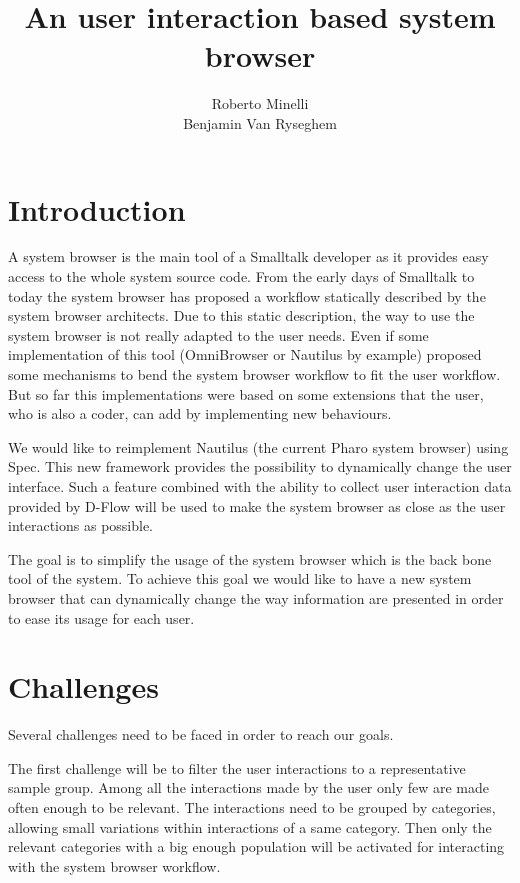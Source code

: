 \documentclass[12pt]{article}
\begin{document}
\title{An user interaction based system browser}
\author{Roberto Minelli\\Benjamin Van Ryseghem}
\maketitle

\section{Introduction}

A system browser is the main tool of a Smalltalk developer as it provides easy access to the whole system source code.
From the early days of Smalltalk to today the system browser has proposed a workflow statically described by the system browser architects.
Due to this static description, the way to use the system browser is not really adapted to the user needs. 
Even if some implementation of this tool (OmniBrowser or Nautilus by example) proposed some mechanisms to bend the system browser workflow to fit the user workflow.
But so far this implementations were based on some extensions that the user, who is also a coder, can add by implementing new behaviours.

We would like to reimplement Nautilus (the current Pharo system browser) using Spec.
This new framework provides the possibility to dynamically change the user interface.
Such a feature combined with the ability to collect user interaction data provided by D-Flow will be used to make the system browser 
as close as the user interactions as possible.

The goal is to simplify the usage of the system browser which is the back bone tool of the system. 
To achieve this goal we would like to have a new system browser that can dynamically change the way information are presented in order to ease its usage for each user.

\section{Challenges}

Several challenges need to be faced in order to reach our goals.

The first challenge will be to filter the user interactions to a representative sample group. 
Among all the interactions made by the user only few are made often enough to be relevant.
The interactions need to be grouped by categories, allowing small variations within interactions of a same category.
Then only the relevant categories with a big enough population will be activated for interacting with the system browser workflow.
\end{document}
